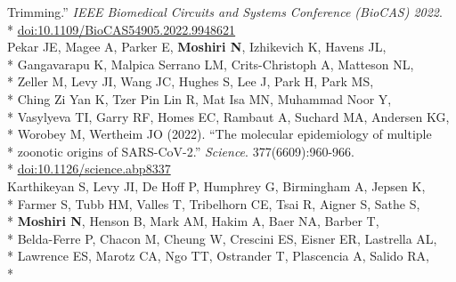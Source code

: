 \documentclass[margin,line]{res}
\begin{document}
\begin{resume}
\hspace*{9.5mm} Trimming.'' \textit{IEEE Biomedical Circuits and Systems Conference (BioCAS) 2022}.\\*\vspace{2mm}
\hspace*{8mm} \href{https://doi.org/10.1109/BioCAS54905.2022.9948621}{doi:10.1109/BioCAS54905.2022.9948621}\\
\hspace*{4mm} Pekar JE, Magee A, Parker E, \textbf{Moshiri N}, Izhikevich K, Havens JL,\\*
\hspace*{9.5mm} Gangavarapu K, Malpica Serrano LM, Crits-Christoph A, Matteson NL,\\*
\hspace*{9.5mm} Zeller M, Levy JI, Wang JC, Hughes S, Lee J, Park H, Park MS,\\*
\hspace*{9.5mm} Ching Zi Yan K, Tzer Pin Lin R, Mat Isa MN, Muhammad Noor Y,\\*
\hspace*{9.5mm} Vasylyeva TI, Garry RF, Homes EC, Rambaut A, Suchard MA, Andersen KG,\\*
\hspace*{9.5mm} Worobey M, Wertheim JO (2022). ``The molecular epidemiology of multiple\\*
\hspace*{9.5mm} zoonotic origins of SARS-CoV-2.'' \textit{Science}. 377(6609):960-966.\\*\vspace{2mm}
\hspace*{8mm} \href{https://doi.org/10.1126/science.abp8337}{doi:10.1126/science.abp8337}\\
\hspace*{4mm} Karthikeyan S, Levy JI, De Hoff P, Humphrey G, Birmingham A, Jepsen K,\\*
\hspace*{9.5mm} Farmer S, Tubb HM, Valles T, Tribelhorn CE, Tsai R, Aigner S, Sathe S,\\*
\hspace*{9.5mm} \textbf{Moshiri N}, Henson B, Mark AM, Hakim A, Baer NA, Barber T,\\*
\hspace*{9.5mm} Belda-Ferre P, Chacon M, Cheung W, Crescini ES, Eisner ER, Lastrella AL,\\*
\hspace*{9.5mm} Lawrence ES, Marotz CA, Ngo TT, Ostrander T, Plascencia A, Salido RA,\\*

\end{resume}
\end{document}
